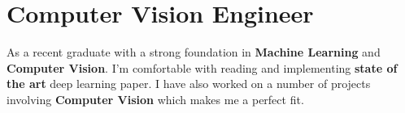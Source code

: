 
\section{Computer Vision Engineer}
\small{
    As a recent graduate with a strong foundation in \textbf{Machine Learning} and \textbf{Computer Vision}. I'm comfortable with reading and implementing \textbf{state of the art} deep learning paper. I have also worked on a number of projects involving \textbf{Computer Vision} which makes me a perfect fit.
}